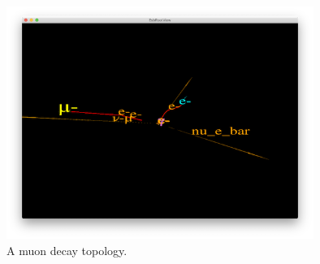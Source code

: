 \begin{figure}[ht]
\centering
\includegraphics[width=10cm,clip]{neard_MCTrack_arrow}
\caption{A muon decay topology.}
\label{fig-muon-decay}
\end{figure}
